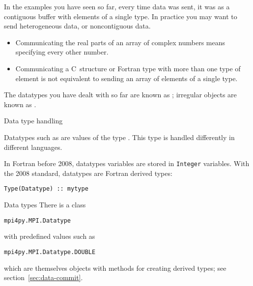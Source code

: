 

In the examples you have seen so far, every time data was sent,
it was as a contiguous buffer with elements of a single type.
In practice you may want to send heterogeneous data, or
noncontiguous data.
\begin{itemize}
\item Communicating the real parts of an array of complex numbers
  means specifying every other number.
\item Communicating a C~structure or Fortran type with more than one
  type of element is not equivalent to sending an array of elements of
  a single type.
\end{itemize}
The datatypes you have dealt with so far are known as
; irregular objects
are known as .

 {Data type handling}
\label{sec:mpi-datatype}

Datatypes such as  are values
of the type .
This type is handled differently in different languages.

\begin{fortrannote}
  In Fortran before 2008, datatypes variables are stored in
  \lstinline{Integer} variables.
  With the 2008 standard, datatypes are Fortran derived types:
\begin{lstlisting}
Type(Datatype) :: mytype
\end{lstlisting}
\end{fortrannote}

\begin{pythonnote}{Data types}
  There is a class
\begin{lstlisting}
mpi4py.MPI.Datatype
\end{lstlisting}
  with predefined values such as 
\begin{lstlisting}
mpi4py.MPI.Datatype.DOUBLE
\end{lstlisting}
  which are themselves objects with methods
  for creating derived types;
  see section~\ref{sec:data-commit}.
\end{pythonnote}

